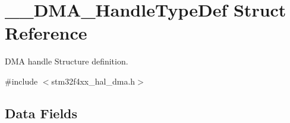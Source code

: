 \hypertarget{struct_____d_m_a___handle_type_def}{}\section{\+\_\+\+\_\+\+D\+M\+A\+\_\+\+Handle\+Type\+Def Struct Reference}
\label{struct_____d_m_a___handle_type_def}


D\+MA handle Structure definition.  




{\ttfamily \#include $<$stm32f4xx\+\_\+hal\+\_\+dma.\+h$>$}

\subsection*{Data Fields}
